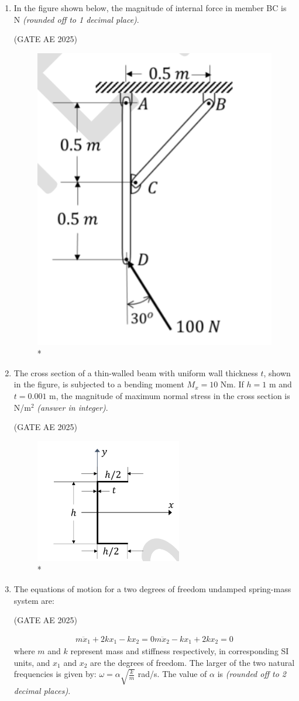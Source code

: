 \documentclass[journal,12pt,onecolumn]{IEEEtran}
\theoremstyle{remark}
\begin{document}
\begin{flushleft}
\begin{enumerate}
\item In the figure shown below, the magnitude of internal force in member BC is \underline{\hspace{3cm}} N \textit{(rounded off to 1 decimal place)}. 

\hfill (GATE AE 2025)

\begin{figure}
\includegraphics[width=0.3\columnwidth]{figs/53.png}
\caption{*}
    \label{fig:placeholder}
\end{figure}


\item The cross section of a thin-walled beam with uniform wall thickness $t$, shown in the figure, is subjected to a bending moment $M_x = 10$ Nm. If $h = 1$ m and $t = 0.001$ m, the magnitude of maximum normal stress in the cross section is \underline{\hspace{3cm}} N/m$^2$ \textit{(answer in integer)}.

\hfill (GATE AE 2025)

\begin{figure}
\includegraphics[width=0.4\columnwidth]{figs/54.png}
\caption{*}
    \label{fig:placeholder}
\end{figure}

\item The equations of motion for a two degrees of freedom undamped spring-mass system are:

\hfill (GATE AE 2025)

\begin{align*}
m\ddot{x}_1 + 2kx_1 - kx_2 = 0
m\ddot{x}_2 - kx_1 + 2kx_2 = 0
\end{align*}
where $m$ and $k$ represent mass and stiffness respectively, in corresponding SI units, and $x_1$ and $x_2$ are the degrees of freedom. The larger of the two natural frequencies is given by: $\omega = \alpha \sqrt{\frac{k}{m}}$ rad/s. The value of $\alpha$ is \underline{\hspace{3cm}} \textit{(rounded off to 2 decimal places)}.


\end{enumerate}
\end{flushleft}
\end{document}
